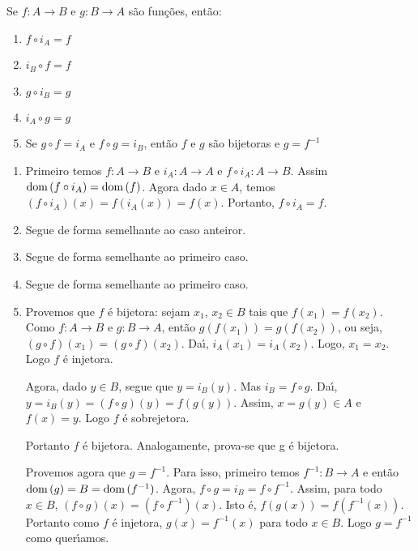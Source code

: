\begin{proposicao}\label{propriedades_identidade}
	Se $f : A \to B$ e $g : B \to A$ s{\~a}o fun{\c c}{\~o}es, ent{\~a}o:
	\begin{enumerate}[label={\roman*})]
		\item $f\circ i_{A} = f$
		\item $i_{B}\circ f = f$
		\item $g\circ i_{B} = g$
		\item $i_{A}\circ g = g$
		\item Se $g\circ f = i_{A}$ e $f\circ g = i_{B}$, ent{\~a}o $f$ e $g$ s{\~a}o bijetoras e $g=f^{-1}$
	\end{enumerate}
\end{proposicao}
\begin{prova}
	\begin{enumerate}[label={\roman*})]
		\item Primeiro temos $f: A \to B$ e $i_{A} : A \to A$ e $f\circ i_{A} : A \to B$. Assim ${\rm dom\,}(f\circ i_{A}) = {\rm dom\,}(f)$. Agora dado $x \in A$, temos $(f\circ i_{A})(x) = f(i_{A}(x)) = f(x)$. Portanto, $f\circ i_{A} = f$.
		\item Segue de forma semelhante ao caso anteiror.
		\item Segue de forma semelhante ao primeiro caso.
		\item Segue de forma semelhante ao primeiro caso.
		\item Provemos que $f$ \'e bijetora: sejam $x_1$, $x_2 \in B$ tais que $f(x_1) = f(x_2)$. Como $f : A \to B$ e $g : B \to A$, ent{\~a}o $g(f(x_1)) = g(f(x_2))$, ou seja, $(g\circ f)(x_1) = (g\circ f)(x_2)$. Da{\'\i}, $i_{A}(x_1) = i_{A}(x_2)$. Logo, $x_1 = x_2$. Logo $f$ {\'e} injetora.

		Agora, dado $y \in B$, segue que $y = i_{B}(y)$. Mas $i_{B} = f\circ g$. Da{\'\i}, $y = i_{B}(y) = (f\circ g)(y) = f(g(y))$. Assim, $x = g(y)\in A$ e $f(x) = y$. Logo $f$ {\'e} sobrejetora.

		Portanto $f$ {\'e} bijetora. Analogamente, prova-se que g {\'e} bijetora. 

		Provemos agora que $g = f^{-1}$. Para isso, primeiro temos  $f^{-1} : B \to A$ e ent\~ao ${\rm dom\,}(g) = B = {\rm dom\,}(f^{-1})$. Agora, $f\circ g = i_{B} = f\circ f^{-1}$. Assim, para todo $x \in B$, $(f\circ g)(x) = (f\circ f^{-1})(x)$. Isto {\'e}, $f(g(x)) = f(f^{-1}(x))$. Portanto como $f$ \'e injetora, $g(x) = f^{-1}(x)$ para todo $x\in B$. Logo $g = f^{-1}$ como quer{\'\i}amos.
	\end{enumerate}
\end{prova}